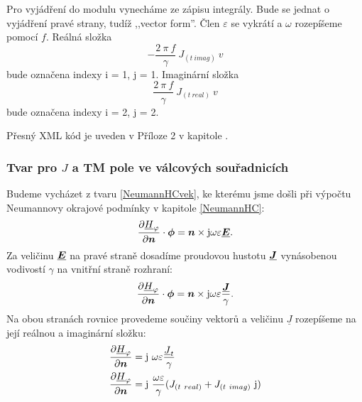 \documentclass[12pt,a4paper,oneside]{article}
\numberwithin{equation}{section} %
\numberwithin{figure}{section} %
\numberwithin{table}{section} %
\newcommand{\mj}{\mathrm{j}} %
\renewcommand{\vec}[1]{\mbox{\boldmath$#1$}} %
\newcommand{\faz}[1]{{\underline{#1}}} %
\begin{document}
Pro vyjádření do modulu vynecháme ze zápisu integrály. Bude se jednat o vyjádření pravé strany, tudíž ,,vector form''. Člen $\varepsilon$ se vykrátí a $\omega$ rozepíšeme pomocí $f$. Reálná složka  
\begin{equation}
- \frac{2 ~ \pi ~ f}{\gamma} ~ J_{(t~imag)} ~ v
\end{equation} 
bude označena indexy i = 1, j = 1. Imaginární složka 
\begin{equation}
\frac{2 ~ \pi ~ f}{\gamma} ~ J_{(t~real)} ~ v
\end{equation}
bude označena indexy i = 2, j = 2.

Přesný XML kód je uveden v Příloze 2 v kapitole .


\subsubsection*{Tvar pro \faz{\vec{J}} a TM pole ve válcových souřadnicích}
Budeme vycházet z tvaru \ref{NeumannHCvek}, ke kterému jsme došli při výpočtu Neumannovy okrajové podmínky v kapitole \ref{NeumannHC}:
\begin{equation}
\frac{\partial \faz{H}_{\varphi}}{\partial \vec{n}} \cdot \vec{\phi} = \vec{n} \times \mj \omega \varepsilon \faz{\vec{E}} .
\end{equation}
Za veličinu $\faz{\vec{E}}$ na pravé straně dosadíme proudovou hustotu $\faz{\vec{J}}$ vynásobenou vodivostí $\gamma$ na vnitřní straně rozhraní:
\begin{equation}
\frac{\partial \faz{H}_{\varphi}}{\partial \vec{n}} \cdot \vec{\phi} = \vec{n} \times \mj \omega \varepsilon \frac{\faz{\vec{J}}}{\gamma}.
\end{equation}
Na obou stranách rovnice provedeme součiny vektorů a veličinu $\faz{J}$ rozepíšeme na její reálnou a imaginární složku:
\begin{subequations}
\begin{align}
\frac{\partial \faz{H} _{\varphi}}{\partial \vec{n}} &= \mj ~ \omega \varepsilon \frac{\faz{J} _t}{\gamma}
\\
\frac{\partial \faz{H} _{\varphi}}{\partial \vec{n}} &= \mj ~ \frac{\omega \varepsilon}{\gamma} (J _{(t~real)} + J _{(t~imag)} ~ \mj)
\end{align}
\end{subequations}
\end{document}
